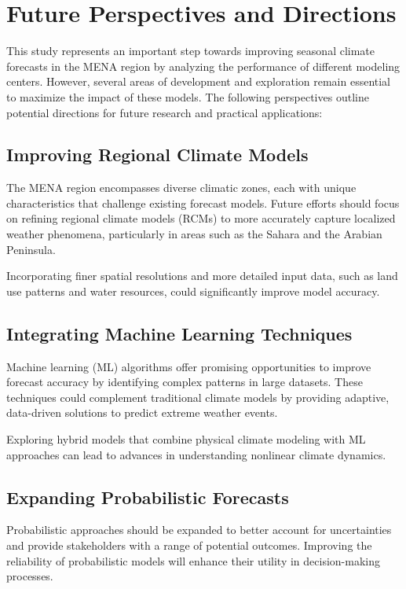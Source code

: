 \chapter{Future Perspectives and Directions}

This study represents an important step towards improving seasonal climate forecasts in the MENA region by analyzing the performance of different modeling centers. However, several areas of development and exploration remain essential to maximize the impact of these models. The following perspectives outline potential directions for future research and practical applications:

\section{Improving Regional Climate Models}

The MENA region encompasses diverse climatic zones, each with unique characteristics that challenge existing forecast models. Future efforts should focus on refining regional climate models (RCMs) to more accurately capture localized weather phenomena, particularly in areas such as the Sahara and the Arabian Peninsula.

Incorporating finer spatial resolutions and more detailed input data, such as land use patterns and water resources, could significantly improve model accuracy.

\section{Integrating Machine Learning Techniques}

Machine learning (ML) algorithms offer promising opportunities to improve forecast accuracy by identifying complex patterns in large datasets. These techniques could complement traditional climate models by providing adaptive, data-driven solutions to predict extreme weather events.

Exploring hybrid models that combine physical climate modeling with ML approaches can lead to advances in understanding nonlinear climate dynamics.

\section{Expanding Probabilistic Forecasts}

Probabilistic approaches should be expanded to better account for uncertainties and provide stakeholders with a range of potential outcomes. Improving the reliability of probabilistic models will enhance their utility in decision-making processes.

